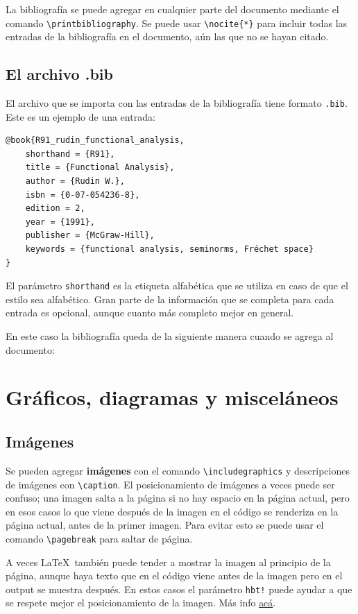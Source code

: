 \documentclass[12pt, spanish]{article}
\theoremstyle{definition} %
\theoremstyle{remark} %
\theoremstyle{plain} %
\theoremstyle{plain} %
\theoremstyle{plain} %
\theoremstyle{plain} %
\theoremstyle{plain} %
\theoremstyle{remark} %
\begin{document}
La bibliografía se puede agregar en cualquier parte del documento mediante el comando \verb|\printbibliography|. Se puede usar \verb|\nocite{*}| para incluir todas las entradas de la bibliografía en el documento, aún las que no se hayan citado.

\subsection{El archivo .bib}

El archivo que se importa con las entradas de la bibliografía tiene formato \verb|.bib|. Este es un ejemplo de una entrada:
\begin{verbatim}
@book{R91_rudin_functional_analysis,
    shorthand = {R91},
    title = {Functional Analysis},
    author = {Rudin W.},
    isbn = {0-07-054236-8},
    edition = 2,
    year = {1991},
    publisher = {McGraw-Hill},
    keywords = {functional analysis, seminorms, Fréchet space}
}
\end{verbatim}
El parámetro \verb|shorthand| es la etiqueta alfabética que se utiliza en caso de que el estilo sea alfabético. Gran parte de la información que se completa para cada entrada es opcional, aunque cuanto más completo mejor en general.

En este caso la bibliografía queda de la siguiente manera cuando se agrega al documento:

\printbibliography[
    title=Bibliografía, %
]


\section{Gráficos, diagramas y misceláneos}

\subsection{Imágenes}

Se pueden agregar \textbf{imágenes} con el comando \verb|\includegraphics| y descripciones de imágenes con \verb|\caption|. El posicionamiento de imágenes a veces puede ser confuso; una imagen salta a la página si no hay espacio en la página actual, pero en esos casos lo que viene después de la imagen en el código se renderiza en la página actual, antes de la primer imagen. Para evitar esto se puede usar el comando \verb|\pagebreak| para saltar de página.

A veces \LaTeX\ también puede tender a mostrar la imagen al principio de la página, aunque haya texto que en el código viene antes de la imagen pero en el output se muestra después. En estos casos el parámetro \verb|hbt!| puede ayudar a que se respete mejor el posicionamiento de la imagen. Más info \href{https://www.overleaf.com/learn/latex/Questions/How_can_I_get_my_table_or_figure_to_stay_where_they_are\%2C_instead_of_going_to_the_next_page\%3F}{acá}.
\end{document}
